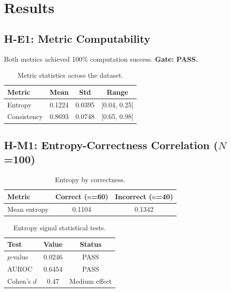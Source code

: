 \section{Results}

\subsection{H-E1: Metric Computability}

Both metrics achieved 100\% computation success. \textbf{Gate: PASS.}

\begin{table}[h]
\centering
\begin{tabular}{lccc}
\toprule
Metric & Mean & Std & Range \\
\midrule
Entropy & 0.1224 & 0.0395 & [0.04, 0.25] \\
Consistency & 0.8693 & 0.0748 & [0.65, 0.98] \\
\bottomrule
\end{tabular}
\caption{Metric statistics across the dataset.}
\label{tab:metrics}
\end{table}

\subsection{H-M1: Entropy-Correctness Correlation ($N$=100)}

\begin{table}[h]
\centering
\begin{tabular}{lcc}
\toprule
Metric & Correct ($n$=60) & Incorrect ($n$=40) \\
\midrule
Mean entropy & 0.1104 & 0.1342 \\
\bottomrule
\end{tabular}
\caption{Entropy by correctness.}
\label{tab:entropy}
\end{table}

\begin{table}[h]
\centering
\begin{tabular}{lcc}
\toprule
Test & Value & Status \\
\midrule
$p$-value & 0.0246 & PASS \\
AUROC & 0.6454 & PASS \\
Cohen's $d$ & 0.47 & Medium effect \\
\bottomrule
\end{tabular}
\caption{Entropy signal statistical tests.}
\label{tab:entropy_stats}
\end{table}

